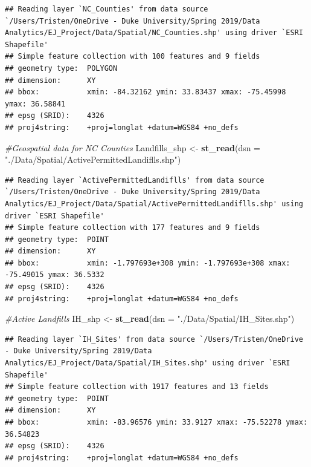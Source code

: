 \documentclass[12pt,]{article}
\newenvironment{Shaded}{\begin{snugshade}}{\end{snugshade}}
\newcommand{\KeywordTok}[1]{\textcolor[rgb]{0.13,0.29,0.53}{\textbf{#1}}}
\newcommand{\DataTypeTok}[1]{\textcolor[rgb]{0.13,0.29,0.53}{#1}}
\newcommand{\StringTok}[1]{\textcolor[rgb]{0.31,0.60,0.02}{#1}}
\newcommand{\CommentTok}[1]{\textcolor[rgb]{0.56,0.35,0.01}{\textit{#1}}}
\newcommand{\NormalTok}[1]{#1}
\begin{document}
\begin{verbatim}
## Reading layer `NC_Counties' from data source `/Users/Tristen/OneDrive - Duke University/Spring 2019/Data Analytics/EJ_Project/Data/Spatial/NC_Counties.shp' using driver `ESRI Shapefile'
## Simple feature collection with 100 features and 9 fields
## geometry type:  POLYGON
## dimension:      XY
## bbox:           xmin: -84.32162 ymin: 33.83437 xmax: -75.45998 ymax: 36.58841
## epsg (SRID):    4326
## proj4string:    +proj=longlat +datum=WGS84 +no_defs
\end{verbatim}

\begin{Shaded}
\begin{Highlighting}[]
\CommentTok{#Geospatial data for NC Counties}
\NormalTok{Landfills_shp <-}\StringTok{ }\KeywordTok{st_read}\NormalTok{(}\DataTypeTok{dsn =} \StringTok{"./Data/Spatial/ActivePermittedLandiflls.shp"}\NormalTok{)}
\end{Highlighting}
\end{Shaded}

\begin{verbatim}
## Reading layer `ActivePermittedLandiflls' from data source `/Users/Tristen/OneDrive - Duke University/Spring 2019/Data Analytics/EJ_Project/Data/Spatial/ActivePermittedLandiflls.shp' using driver `ESRI Shapefile'
## Simple feature collection with 177 features and 9 fields
## geometry type:  POINT
## dimension:      XY
## bbox:           xmin: -1.797693e+308 ymin: -1.797693e+308 xmax: -75.49015 ymax: 36.5332
## epsg (SRID):    4326
## proj4string:    +proj=longlat +datum=WGS84 +no_defs
\end{verbatim}

\begin{Shaded}
\begin{Highlighting}[]
\CommentTok{#Active Landfills}
\NormalTok{IH_shp <-}\StringTok{ }\KeywordTok{st_read}\NormalTok{(}\DataTypeTok{dsn =} \StringTok{"./Data/Spatial/IH_Sites.shp"}\NormalTok{) }
\end{Highlighting}
\end{Shaded}

\begin{verbatim}
## Reading layer `IH_Sites' from data source `/Users/Tristen/OneDrive - Duke University/Spring 2019/Data Analytics/EJ_Project/Data/Spatial/IH_Sites.shp' using driver `ESRI Shapefile'
## Simple feature collection with 1917 features and 13 fields
## geometry type:  POINT
## dimension:      XY
## bbox:           xmin: -83.96576 ymin: 33.9127 xmax: -75.52278 ymax: 36.54823
## epsg (SRID):    4326
## proj4string:    +proj=longlat +datum=WGS84 +no_defs
\end{verbatim}
\end{document}
